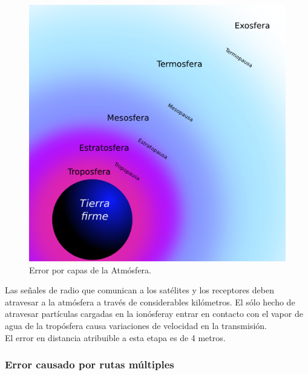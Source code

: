\begin{figure}[!ht]
\centering
\includegraphics[scale=0.48]{Figures/CapasAtm}
\caption[Error por capas de la Atmósfera.]{Error por capas de la Atmósfera\footnotemark.}
\label{fig:ErrAtm}
\end{figure}


Las señales de radio que comunican a los satélites y los receptores deben atravesar a la atmósfera a través de considerables kilómetros. El sólo hecho de atravesar partículas cargadas en la ionósfera\footnotemark y entrar en contacto con el vapor de agua de la tropósfera causa variaciones de velocidad en la transmisión. \\

El error en distancia atribuible a esta etapa es de 4 metros. 


\subsubsection{Error causado por rutas múltiples}

